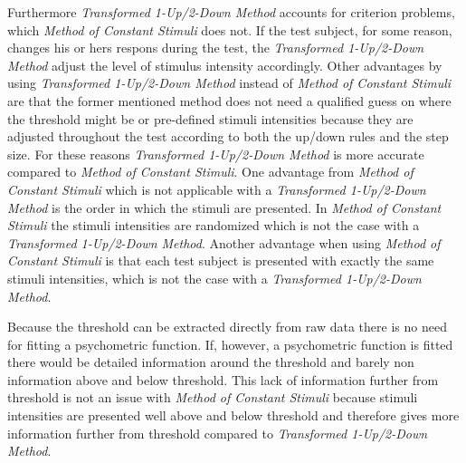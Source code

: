 Furthermore \textit{Transformed 1-Up/2-Down Method} accounts for criterion problems, which \textit{Method of Constant Stimuli} does not. If the test subject, for some reason, changes his or hers respons during the test, the \textit{Transformed 1-Up/2-Down Method} adjust the level of stimulus intensity accordingly. Other advantages by using \textit{Transformed 1-Up/2-Down Method} instead of \textit{Method of Constant Stimuli} are that the former mentioned method does not need a qualified guess on where the threshold might be or pre-defined stimuli intensities because they are adjusted throughout the test according to both the up/down rules and the step size. For these reasons \textit{Transformed 1-Up/2-Down Method} is more accurate compared to \textit{Method of Constant Stimuli}.\blankline
%
One advantage from \textit{Method of Constant Stimuli} which is not applicable with a \textit{Transformed 1-Up/2-Down Method} is the order in which the stimuli are presented. In \textit{Method of Constant Stimuli} the stimuli intensities are randomized which is not the case with a \textit{Transformed 1-Up/2-Down Method}. Another advantage when using \textit{Method of Constant Stimuli} is that each test subject is presented with exactly the same stimuli intensities, which is not the case with a \textit{Transformed 1-Up/2-Down Method}. 

Because the threshold can be extracted directly from raw data there is no need for fitting a psychometric function. If, however, a psychometric function is fitted there would be detailed information around the threshold and barely non information above and below threshold. This lack of information further from threshold is not an issue with \textit{Method of Constant Stimuli} because stimuli intensities are presented well above and below threshold and therefore gives more information further from threshold compared to \textit{Transformed 1-Up/2-Down Method}.      

